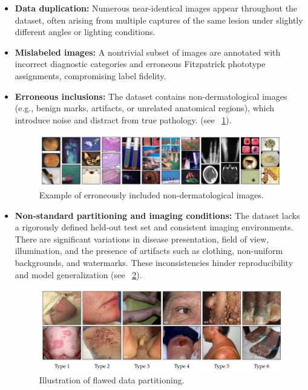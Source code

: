 \begin{itemize}
  \item \textbf{Data duplication:} Numerous near-identical images appear throughout the dataset, often arising from multiple captures of the same lesion under slightly different angles or lighting conditions.
  \item \textbf{Mislabeled images:} A nontrivial subset of images are annotated with incorrect diagnostic categories and erroneous Fitzpatrick phototype assignments, compromising label fidelity.
  \item \textbf{Erroneous inclusions:} The dataset contains non-dermatological images (e.g., benign marks, artifacts, or unrelated anatomical regions), which introduce noise and distract from true pathology. (see \figurename~\ref{fig:fitz_erroneous}).
    \begin{figure}[h!]
      \centering
      \includegraphics[width=1\textwidth]{images/fitz_erroneous.png}
      \caption{Example of erroneously included non-dermatological images.}
      \label{fig:fitz_erroneous}
    \end{figure}
  \item \textbf{Non-standard partitioning and imaging conditions:} The dataset lacks a rigorously defined held-out test set and consistent imaging environments. There are significant variations in disease presentation, field of view, illumination, and the presence of artifacts such as clothing, non-uniform backgrounds, and watermarks. These inconsistencies hinder reproducibility and model generalization (see \figurename~\ref{fig:non_standard_splits}).
    \begin{figure}[h!]
      \centering
      \includegraphics[width=1\textwidth]{images/fitz_partitioning.png}
      \caption{Illustration of flawed data partitioning.}
      \label{fig:non_standard_splits}
    \end{figure}
\end{itemize}

